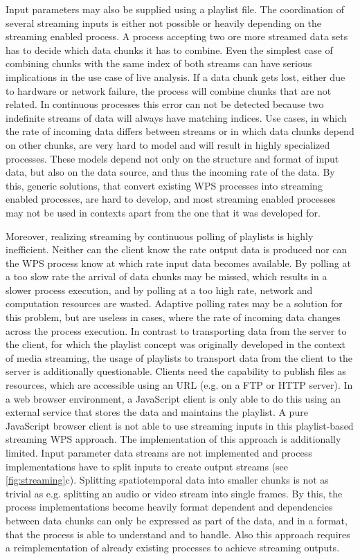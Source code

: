 Input parameters may also be supplied using a playlist file. The coordination of several streaming inputs is either not possible or heavily depending on the streaming enabled process. A process accepting two ore more streamed data sets has to decide which data chunks it has to combine. Even the simplest case of combining chunks with the same index of both streams can have serious implications in the use case of live analysis. If a data chunk gets lost, either due to hardware or network failure, the process will combine chunks that are not related. In continuous processes this error can not be detected because two indefinite streams of data will always have matching indices. Use cases, in which the rate of incoming data differs between streams or in which data chunks depend on other chunks, are very hard to model and will result in highly specialized processes. These models depend not only on the structure and format of input data, but also on the data source, and thus the incoming rate of the data. By this, generic solutions, that convert existing \ac{WPS} processes into streaming enabled processes, are hard to develop, and most streaming enabled processes may not be used in contexts apart from the one that it was developed for.

Moreover, realizing streaming by continuous polling of playlists is highly inefficient. Neither can the client know the rate output data is produced nor can the \ac{WPS} process know at which rate input data becomes available. By polling at a too slow rate the arrival of data chunks may be missed, which results in a slower process execution, and by polling at a too high rate, network and computation resources are wasted. Adaptive polling rates may be a solution for this problem, but are useless in cases, where the rate of incoming data changes across the process execution. In contrast to transporting data from the server to the client, for which the playlist concept was originally developed in the context of media streaming, the usage of playlists to transport data from the client to the server is additionally questionable. Clients need the capability to publish files as resources, which are accessible using an URL (e.g. on a FTP or HTTP server). In a web browser environment, a JavaScript client is only able to do this using an external service that stores the data and maintains the playlist. A pure JavaScript browser client is not able to use streaming inputs in this playlist-based streaming \ac{WPS} approach. The implementation of this approach is additionally limited. Input parameter data streams are not implemented and process implementations have to split inputs to create output streams (see \cref{fig:streaming}c). Splitting spatiotemporal data into smaller chunks is not as trivial as e.g. splitting an audio or video stream into single frames. By this, the process implementations become heavily format dependent and dependencies between data chunks can only be expressed as part of the data, and in a format, that the process is able to understand and to handle. Also this approach requires a reimplementation of already existing processes to achieve streaming outputs.

